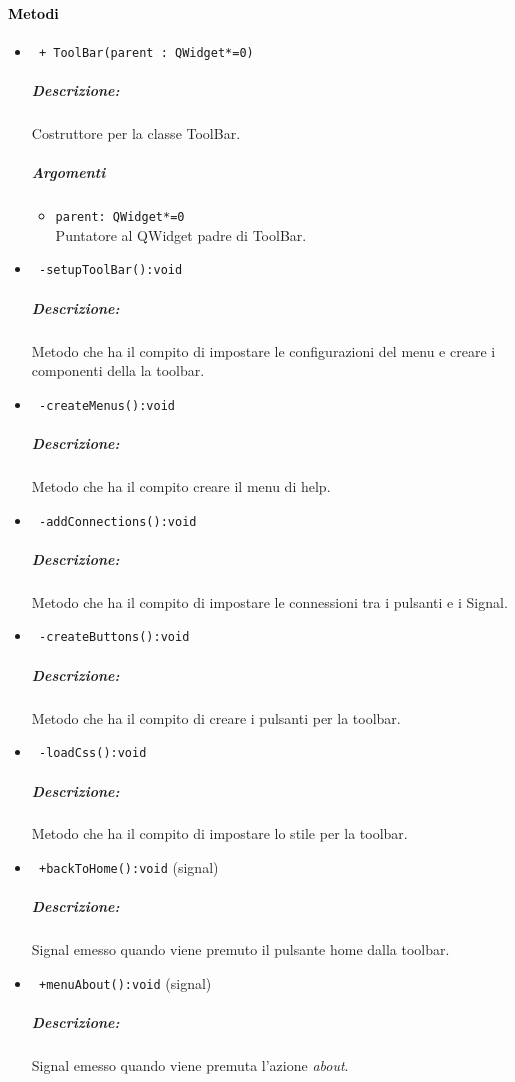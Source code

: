 
\paragraph{\textcolor{black}{Metodi\\}}
\begin{itemize}
\item \color{blue}\verb! + ToolBar(parent : QWidget*=0)!
\color{black}
\subparagraph{Descrizione:}
Costruttore per la classe ToolBar. \\
\subparagraph{Argomenti}
\begin{itemize}
\item \color{RoyalPurple} \verb!parent: QWidget*=0 ! \\ Puntatore al QWidget padre di ToolBar.
\end{itemize}

\item \color{blue}\verb! -setupToolBar():void!
\color{black}
\subparagraph{Descrizione:} Metodo che ha il compito di impostare le configurazioni del menu e creare i componenti della la toolbar.
\color{black}
\item \color{blue}\verb! -createMenus():void!
\color{black}
\subparagraph{Descrizione:} Metodo che ha il compito creare il menu di help.

\item \color{blue}\verb! -addConnections():void!
\color{black}
\subparagraph{Descrizione:} Metodo che ha il compito di impostare le connessioni tra i pulsanti e i Signal\g{}.

\item \color{blue}\verb! -createButtons():void!
\color{black}
\subparagraph{Descrizione:} Metodo che ha il compito di creare i pulsanti per la toolbar.

\item \color{blue}\verb! -loadCss():void!
\color{black}
\subparagraph{Descrizione:} Metodo che ha il compito di impostare lo stile per la toolbar.
\item \color{blue}\verb! +backToHome():void! (signal)
\color{black} 
\subparagraph{Descrizione:} Signal\g{} emesso quando viene premuto il pulsante home dalla toolbar.

\item \color{blue}\verb! +menuAbout():void! (signal)
\color{black} 
\subparagraph{Descrizione:} Signal\g{} emesso quando viene premuta l'azione \textit{about}.


\end{itemize}
